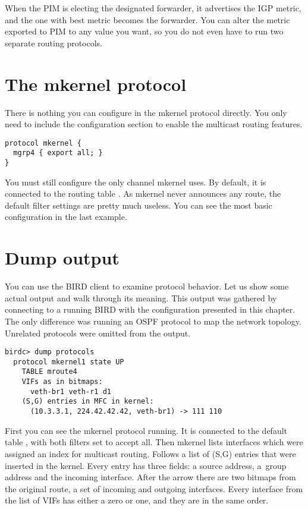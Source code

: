 When the PIM is electing the designated forwarder, it advertises the IGP metric, and
the one with best metric becomes the forwarder. You can alter the metric
exported to PIM to any value you want, so you do not even have to run two
separate routing protocols.

\section{The mkernel protocol}

There is nothing you can configure in the mkernel protocol directly. You only
need to include the configuration section to enable the multicast routing
features.

\begin{lstlisting}
protocol mkernel {
  mgrp4 { export all; }
}
\end{lstlisting}

\noindent You must still configure the only channel mkernel uses. By default, it
is connected to the routing table . As mkernel never announces any
route, the default filter settings are pretty much useless. You can see the
most basic configuration in the last example.

\section{Dump output}
You can use the BIRD client to examine protocol behavior. Let us show some
actual output and walk through its meaning. This output was gathered by
connecting to a running BIRD with the configuration presented in this chapter.
The only difference was running an OSPF protocol to map the network topology.
Unrelated protocols were omitted from the output.

\begin{lstlisting}
birdc> dump protocols
  protocol mkernel1 state UP
    TABLE mroute4
    VIFs as in bitmaps:
      veth-br1 veth-r1 d1
    (S,G) entries in MFC in kernel:
      (10.3.3.1, 224.42.42.42, veth-br1) -> 111 110
\end{lstlisting}

\noindent First you can see the mkernel protocol running. It is connected to the default
table , with both filters set to accept all. Then mkernel lists
interfaces which were assigned an index for multicast routing. Follows a list
of (S,G) entries that were inserted in the kernel. Every entry has three
fields: a source address, a~group address and the incoming interface. After the
arrow there are two bitmaps from the original route, a set of incoming and
outgoing interfaces. Every interface from the list of VIFs has either a zero or
one, and they are in the same order.

